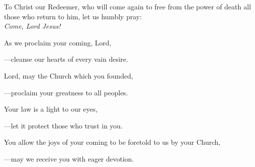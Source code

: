 \intercessions\indent

\begin{hangpar}

To Christ our Redeemer, who will come again to free from the power of death all those who return to him, let us humbly pray:\\
\emph{Come, Lord Jesus!}

\medskip As we proclaim your coming, Lord,

{\color{red}---\thinspace}cleanse our hearts of every vain desire.

\medskip Lord, may the Church which you founded,

{\color{red}---\thinspace}proclaim your greatness to all peoples.

\medskip Your law is a light to our eyes,

{\color{red}---\thinspace}let it protect those who trust in you.

\medskip You allow the joys of your coming to be foretold to us by your Church,

{\color{red}---\thinspace}may we receive you with eager devotion.

\medskip

\end{hangpar}